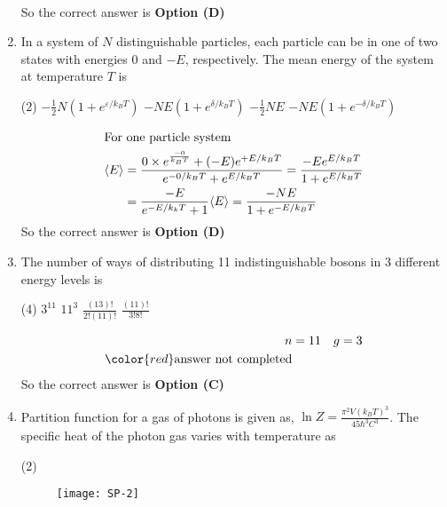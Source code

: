 \begin{enumerate}
\begin{answer}
\begin{align*}
\end{align*}
So the correct answer is \textbf{Option (D)}
\end{answer}
	\item In a system of $N$ distinguishable particles, each particle can be in one of two states with energies 0 and $-E$, respectively. The mean energy of the system at temperature $T$ is
{	}
\begin{tasks}(2)
\task[\textbf{A.}] $-\frac{1}{2} N\left(1+e^{\varepsilon / k_{B} T}\right)$
\task[\textbf{B.}] $-N E\left(1+e^{\delta / k_{B} T}\right)$
\task[\textbf{C.}] $-\frac{1}{2} N E$
\task[\textbf{D.}] $-N E\left(1+e^{-\delta / k_{B} T}\right)$
\end{tasks}
\begin{answer}
\begin{align*}
\intertext{For one particle system}
\langle E\rangle&=\frac{0 \times e^{\frac{-0}{k_{B} T}}+(-E) e^{+E / k_{B} T}}{e^{-0 / k_{B} T}+e^{E / k_{B} T}}=\frac{-E e^{E / k_{B} T}}{1+e^{E / k_{B} T}}\\&=\frac{-E}{e^{-E / k_{k} T}+1}\langle E\rangle=\frac{-N E}{1+e^{-E / k_{B} T}}
\end{align*}
So the correct answer is \textbf{Option (D)}
\end{answer}
	\item The number of ways of distributing 11 indistinguishable bosons in 3 different energy levels is
	{}
\begin{tasks}(4)
\task[\textbf{A.}]  $3^{11}$
\task[\textbf{B.}] $11^{3}$
\task[\textbf{C.}] $\frac{(13) !}{2 !(11) !}$
\task[\textbf{D.}]  $\frac{(11) !}{3 ! 8 !}$
\end{tasks}
\begin{answer}
\begin{align*}
n&=11 \quad g=3\\
\color{red}\text{answer not completed}
\end{align*}
So the correct answer is \textbf{Option (C)}
\end{answer}
	\item Partition function for a gas of photons is given as, $\ln Z=\frac{\pi^{2} V\left(k_{B} T\right)^{3}}{45 \hbar^{3} C^{3}}$. The specific heat of the photon gas varies with temperature as
{	}
\begin{tasks}(2)
\task[\textbf{A.}] \begin{figure}[H]
	\centering
	\texttt{[image: SP-2]}
\end{figure}

\end{tasks}
\end{enumerate}
